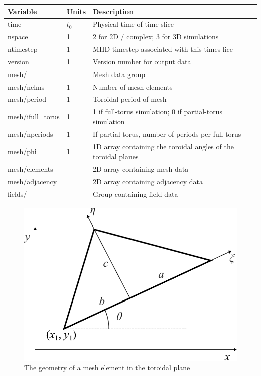 \begin{tabular}{lll}
\textbf{Variable} & \textbf{Units} & \textbf{Description}\\
\hline
time              & $t_0$ & Physical time of time slice\\
nspace            & 1     & 2 for 2D / complex; 3 for 3D simulations\\
ntimestep         & 1     & MHD timestep associated with this times lice\\
version           & 1     & Version number for output data\\
mesh/             &       & Mesh data group\\
mesh/nelms        & 1     & Number of mesh elements\\
mesh/period       & 1     & Toroidal period of mesh\\
mesh/ifull\_torus & 1     & 1 if full-torus simulation; 0 if partial-torus simulation\\
mesh/nperiods     & 1     & If partial torus, number of periods per full torus\\
mesh/phi          & 1     & 1D array containing the toroidal angles of the toroidal planes\\
mesh/elements     &       & 2D array containing mesh data\\
mesh/adjacency    &       & 2D array containing adjacency data\\
fields/           &       & Group containing field data
\end{tabular}

\begin{figure}
\begin{center}
\includegraphics{figures/C1_element.pdf}
\caption{\label{fig:C1}The geometry of a mesh element in the toroidal plane\cite{Jardin04}}
\end{center}
\end{figure}

